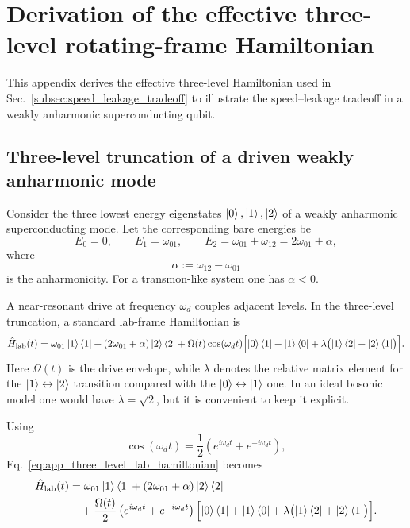 \chapter{Derivation of the effective three-level rotating-frame Hamiltonian}
\label{app:three_level_rotating_hamiltonian_derivation}

This appendix derives the effective three-level Hamiltonian used in Sec.~\ref{subsec:speed_leakage_tradeoff} to illustrate the speed--leakage tradeoff in a weakly anharmonic superconducting qubit.

\section{Three-level truncation of a driven weakly anharmonic mode}

Consider the three lowest energy eigenstates \(\ket{0},\ket{1},\ket{2}\) of a weakly anharmonic superconducting mode. Let the corresponding bare energies be
\begin{equation}
E_0 = 0,
\qquad
E_1 = \omega_{01},
\qquad
E_2 = \omega_{01}+\omega_{12}
=
2\omega_{01}+\alpha,
\label{eq:app_three_level_energies}
\end{equation}
where
\begin{equation}
\alpha := \omega_{12}-\omega_{01}
\label{eq:app_three_level_anharmonicity}
\end{equation}
is the anharmonicity. For a transmon-like system one has \(\alpha<0\).

A near-resonant drive at frequency \(\omega_d\) couples adjacent levels. In the three-level truncation, a standard lab-frame Hamiltonian is
\begin{equation}
\hat H_{\mathrm{lab}}(t)
=
\omega_{01}\ket{1}\bra{1}
+
(2\omega_{01}+\alpha)\ket{2}\bra{2}
+
\Omega(t)\cos(\omega_d t)
\Bigl[
\ket{0}\bra{1}+\ket{1}\bra{0}
+
\lambda\bigl(\ket{1}\bra{2}+\ket{2}\bra{1}\bigr)
\Bigr].
\label{eq:app_three_level_lab_hamiltonian}
\end{equation}
Here \(\Omega(t)\) is the drive envelope, while \(\lambda\) denotes the relative matrix element for the \(\ket{1}\leftrightarrow\ket{2}\) transition compared with the \(\ket{0}\leftrightarrow\ket{1}\) one. In an ideal bosonic model one would have \(\lambda=\sqrt{2}\), but it is convenient to keep it explicit.

Using
\begin{equation}
\cos(\omega_d t)=\frac{1}{2}\left(e^{i\omega_d t}+e^{-i\omega_d t}\right),
\label{eq:app_cosine_expansion_drive}
\end{equation}
Eq.~\eqref{eq:app_three_level_lab_hamiltonian} becomes
\begin{align}
\hat H_{\mathrm{lab}}(t)
&=
\omega_{01}\ket{1}\bra{1}
+
(2\omega_{01}+\alpha)\ket{2}\bra{2}
\nonumber\\
&\quad+
\frac{\Omega(t)}{2}
\left(e^{i\omega_d t}+e^{-i\omega_d t}\right)
\Bigl[
\ket{0}\bra{1}+\ket{1}\bra{0}
+
\lambda\bigl(\ket{1}\bra{2}+\ket{2}\bra{1}\bigr)
\Bigr].
\label{eq:app_three_level_lab_hamiltonian_expanded}
\end{align}

